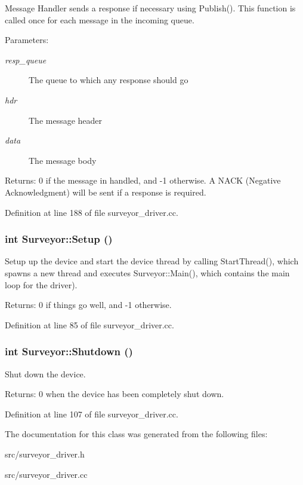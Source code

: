 Message Handler sends a response if necessary using Publish(). This function is called once for each message in the incoming queue. 

\begin{Desc}
\item[Parameters:]
\begin{description}
\item[{\em resp\_\-queue}]The queue to which any response should go \item[{\em hdr}]The message header \item[{\em data}]The message body \end{description}
\end{Desc}
\begin{Desc}
\item[Returns:]0 if the message in handled, and -1 otherwise. A NACK (Negative Acknowledgment) will be sent if a response is required. \end{Desc}


Definition at line 188 of file surveyor\_\-driver.cc.\hypertarget{classSurveyor_c127d6028c08790fe79902b1b8359468}{
\subsubsection[{Setup}]{\setlength{\rightskip}{0pt plus 5cm}int Surveyor::Setup ()}}
\label{classSurveyor_c127d6028c08790fe79902b1b8359468}


Setup up the device and start the device thread by calling StartThread(), which spawns a new thread and executes Surveyor::Main(), which contains the main loop for the driver). 

\begin{Desc}
\item[Returns:]0 if things go well, and -1 otherwise. \end{Desc}


Definition at line 85 of file surveyor\_\-driver.cc.\hypertarget{classSurveyor_cfe0180d05f0a34474a75cdfd87b1a81}{
\subsubsection[{Shutdown}]{\setlength{\rightskip}{0pt plus 5cm}int Surveyor::Shutdown ()}}
\label{classSurveyor_cfe0180d05f0a34474a75cdfd87b1a81}


Shut down the device. 

\begin{Desc}
\item[Returns:]0 when the device has been completely shut down. \end{Desc}


Definition at line 107 of file surveyor\_\-driver.cc.

The documentation for this class was generated from the following files:\begin{CompactItemize}
\item 
src/surveyor\_\-driver.h\item 
src/surveyor\_\-driver.cc\end{CompactItemize}
